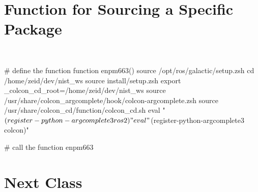 \documentclass[usenames,11,dvipsnames,svgnames,x11names,aspectratio=1610,bibref]{beamer}
\newcommand{\mydisclaimer}{{\color{disclaimer}{\scriptsize ROS 2 -- Part I}}}
\newcommand{\iconColor}[1]{\textcolor{iconColor}{#1}}
\newcommand{\iconWarningColor}[1]{\textcolor{iconWarningColor}{#1}}
\newcommand\doublerulefill{\leavevmode\leaders\vbox{\hrule width .1pt\kern1pt\hrule}\hfill\kern0pt }
\renewcommand\sec{{\cnordSix{\secname}\hfill\mydisclaimer~} }
\newcommand{\mywarning}{\iconWarningColor{\faExclamationTriangle}\xspace}
\newcommand{\myinfo}{\iconColor{\faInfoCircle}\xspace}
\begin{document}

\section{Function for Sourcing a Specific Package}
\begin{frame}[fragile]{\sec}
\vspace*{\fill}
\begin{center} 

\begin{bashScriptList}
# define the function
function enpm663(){
  source /opt/ros/galactic/setup.zsh
  cd /home/zeid/dev/nist_ws
  source install/setup.zsh
  export _colcon_cd_root=/home/zeid/dev/nist_ws
  source /usr/share/colcon_argcomplete/hook/colcon-argcomplete.zsh
  source /usr/share/colcon_cd/function/colcon_cd.sh
  eval "$(register-python-argcomplete3 ros2)"
  eval "$(register-python-argcomplete3 colcon)"
}

# call the function
enpm663
\end{bashScriptList}

\end{center}
\vspace*{\fill}
\end{frame}




\section{Next Class}
\end{document}
